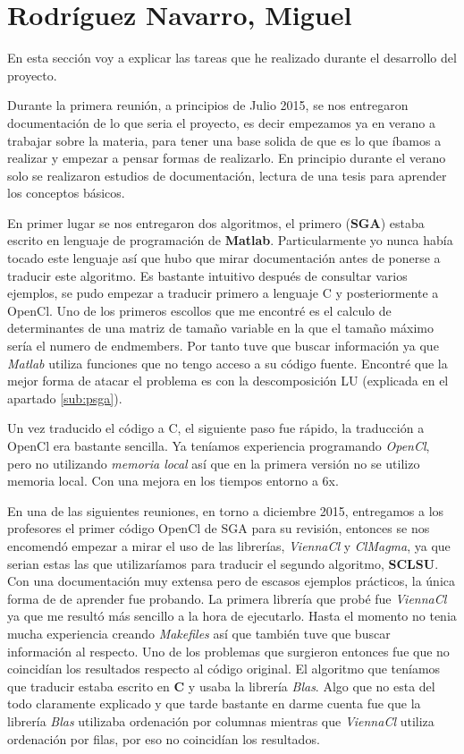 \newpage

\section{Rodríguez Navarro, Miguel}
\label{Appendix:C1}

En esta sección voy a explicar las tareas que he realizado durante el desarrollo del proyecto.

Durante la primera reunión, a principios de Julio 2015, se nos entregaron documentación de lo que seria el proyecto, es decir empezamos ya en verano a trabajar sobre la materia, para tener una base solida de que es lo que íbamos a realizar y empezar a pensar formas de realizarlo. En principio durante el verano solo se realizaron estudios de documentación, lectura de una tesis para aprender los conceptos básicos.

En primer lugar se nos entregaron dos algoritmos, el primero (\textbf{SGA}) estaba escrito en lenguaje de programación de \textbf{Matlab}. Particularmente yo nunca había tocado este lenguaje así que hubo que mirar documentación antes de ponerse a traducir este algoritmo. Es bastante intuitivo después de consultar varios ejemplos, se pudo empezar a traducir primero a lenguaje C y posteriormente a OpenCl. Uno de los primeros escollos que me encontré es el calculo de determinantes de una matriz de tamaño variable en la que el tamaño máximo sería el numero de endmembers. Por tanto tuve que buscar información ya que \textit{Matlab} utiliza funciones que no tengo acceso a su código fuente. Encontré que la mejor forma de atacar el problema es con la descomposición LU (explicada en el apartado \ref{sub:psga}).

Un vez traducido el código a C, el siguiente paso fue rápido, la traducción a OpenCl era bastante sencilla. Ya teníamos experiencia programando \textit{OpenCl}, pero no utilizando \textit{memoria local} así que en la primera versión no se utilizo memoria local. Con una mejora en los tiempos entorno a 6x.

En una de las siguientes reuniones, en torno a diciembre 2015, entregamos a los profesores el primer código OpenCl de SGA para su revisión, entonces se nos encomendó empezar a mirar el uso de las librerías, \textit{ViennaCl} y \textit{ClMagma}, ya que serian estas las que utilizaríamos para traducir el segundo algoritmo, \textbf{SCLSU}. Con una documentación muy extensa pero de escasos ejemplos prácticos, la única forma de de aprender fue probando. La primera librería que probé fue \textit{ViennaCl} ya que me resultó más sencillo a la hora de ejecutarlo. Hasta el momento no tenia mucha experiencia creando \textit{Makefiles} así que también tuve que buscar información al respecto. Uno de los problemas que surgieron entonces fue que no coincidían los resultados respecto al código original. El algoritmo que teníamos que traducir estaba escrito en \textbf{C} y usaba la librería \textit{Blas}. Algo que no esta del todo claramente explicado y que tarde bastante en darme cuenta fue que la librería \textit{Blas} utilizaba ordenación por columnas mientras que \textit{ViennaCl} utiliza ordenación por filas, por eso no coincidían los resultados.

